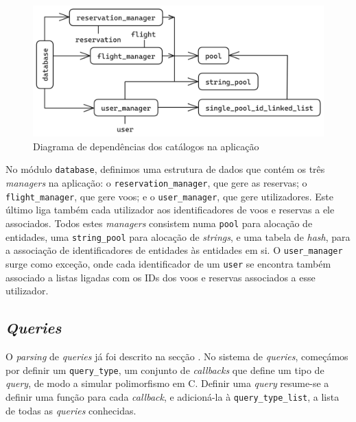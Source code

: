 \documentclass[12pt, a4paper]{article}
\begin{document}
\begin{figure}[ht]
    \centering
    \includegraphics[scale=0.2]{res/database.png}
    \caption{Diagrama de dependências dos catálogos na aplicação}
    \label{fig:catalogs}
\end{figure}

No módulo \texttt{database}, definimos uma estrutura de dados que contém os três \emph{managers} na
aplicação: o \texttt{reservation\_manager}, que gere as reservas; o \texttt{flight\_manager}, que
gere voos; e o \texttt{user\_manager}, que gere utilizadores. Este último liga também cada
utilizador aos identificadores de voos e reservas a ele associados. Todos estes \emph{managers}
consistem numa \texttt{pool} para alocação de entidades, uma \texttt{string\_pool} para alocação de
\emph{strings}, e uma tabela de \emph{hash}, para a associação de identificadores de entidades às
entidades em si. O \texttt{user\_manager} surge como exceção, onde cada identificador de um
\texttt{user} se encontra também associado a listas ligadas com os IDs dos voos e reservas
associados a esse utilizador.

\subsection{\emph{Queries}}
\label{sec:queries}

O \emph{parsing} de \emph{queries} já foi descrito na secção . No sistema de
\emph{queries}, começámos por definir um \texttt{query\_type}, um conjunto de \emph{callbacks} que
define um tipo de \emph{query}, de modo a simular polimorfismo em C. Definir uma \emph{query}
resume-se a definir uma função para cada \emph{callback}, e adicioná-la à
\texttt{query\_type\_list}, a lista de todas as \emph{queries} conhecidas.
\end{document}
